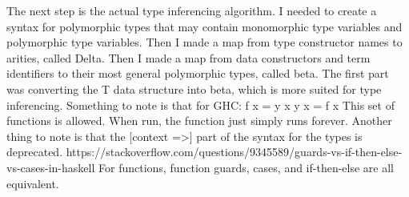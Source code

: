 The next step is the actual type inferencing algorithm.
	I needed to create a syntax for polymorphic types that may contain monomorphic type variables and polymorphic type variables.
	Then I made a map from type constructor names to arities, called Delta.
	Then I made a map from data constructors and term identifiers to their most general polymorphic types, called beta.
	The first part was converting the T data structure into beta, which is more suited for type inferencing.
	Something to note is that for GHC:
f x = y x
y x = f x
This set of functions is allowed. When run, the function just simply runs forever.
	Another thing to note is that the
[context =>]
part of the syntax for the types is deprecated.
https://stackoverflow.com/questions/9345589/guards-vs-if-then-else-vs-cases-in-haskell
For functions, function guards, cases, and if-then-else are all equivalent.